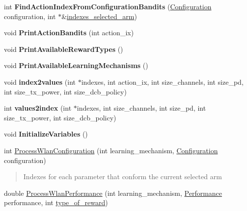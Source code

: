 \begin{DoxyCompactItemize}
int {\bfseries Find\+Action\+Index\+From\+Configuration\+Bandits} (\hyperlink{structConfiguration}{Configuration} configuration, int $\ast$\&\hyperlink{classPreProcessor_a1976003ebd08bbee7836fe0bbe2d7be9}{indexes\+\_\+selected\+\_\+arm})
\item 
\mbox{\label{classPreProcessor_a498d0b26c66a2fd2c20a19afe491c5d6}} 
void {\bfseries Print\+Action\+Bandits} (int action\+\_\+ix)
\item 
\mbox{\label{classPreProcessor_a675a191d53d9e095138881eabbebba7b}} 
void {\bfseries Print\+Available\+Reward\+Types} ()
\item 
\mbox{\label{classPreProcessor_aadb7f0d35267038245fa9482da146f70}} 
void {\bfseries Print\+Available\+Learning\+Mechanisms} ()
\item 
\mbox{\label{classPreProcessor_a11800dabafafd6de4cd1129ebb56cab2}} 
void {\bfseries index2values} (int $\ast$indexes, int action\+\_\+ix, int size\+\_\+channels, int size\+\_\+pd, int size\+\_\+tx\+\_\+power, int size\+\_\+dcb\+\_\+policy)
\item 
\mbox{\label{classPreProcessor_a818563f4556239d78eb3874318fc33ba}} 
int {\bfseries values2index} (int $\ast$indexes, int size\+\_\+channels, int size\+\_\+pd, int size\+\_\+tx\+\_\+power, int size\+\_\+dcb\+\_\+policy)
\item 
\mbox{\label{classPreProcessor_a3a865e8349e7eabfa968eea7075386c2}} 
void {\bfseries Initialize\+Variables} ()
\item 
int \hyperlink{classPreProcessor_af3e7c8f2449e69b553106203314903f0}{Process\+Wlan\+Configuration} (int learning\+\_\+mechanism, \hyperlink{structConfiguration}{Configuration} configuration)
\begin{DoxyCompactList}\small\item\em \begin{quote}
Indexes for each parameter that conform the current selected arm \end{quote}
\end{DoxyCompactList}\item 
double \hyperlink{classPreProcessor_a2abd608c09942dfa2885e8815907f3cc}{Process\+Wlan\+Performance} (int learning\+\_\+mechanism, \hyperlink{structPerformance}{Performance} performance, int \hyperlink{classPreProcessor_a6b837daa4f40e20f9d7bbdbd1b2ef1d2}{type\+\_\+of\+\_\+reward})

\end{DoxyCompactItemize}
